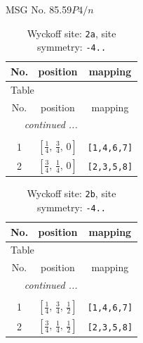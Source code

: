 \documentclass[fleqn,8pt]{jsarticle}
\begin{document}
\setcounter{MaxMatrixCols}{32}

\renewcommand{\tablename}{Table~}
\renewcommand{\figurename}{Figure~}
\begin{center}
\LARGE
MSG No. 85.59\quad$P4/n$
\end{center}
\renewcommand{\arraystretch}{1.2}
\begin{longtable}{ccc}
\caption{Wyckoff site: {\tt 2a}, site symmetry: {\tt -4..}}
 \\
 \hline \hline
No. & position & mapping \\ \hline \endfirsthead

\multicolumn{2}{l}{\tablename\ \thetable{}} \\
 \hline \hline
No. & position & mapping \\ \hline \endhead

 \hline \hline
\multicolumn{2}{r}{\footnotesize\it continued ...} \\ \endfoot

 \hline \hline
\multicolumn{2}{r}{} \\ \endlastfoot

1 & $\left[ \frac{1}{4},\, \frac{3}{4},\, 0 \right]$ & {\tt [1,4,6,7]} \\ \hline
2 & $\left[ \frac{3}{4},\, \frac{1}{4},\, 0 \right]$ & {\tt [2,3,5,8]} \\
\end{longtable}
\renewcommand{\arraystretch}{1.2}
\begin{longtable}{ccc}
\caption{Wyckoff site: {\tt 2b}, site symmetry: {\tt -4..}}
 \\
 \hline \hline
No. & position & mapping \\ \hline \endfirsthead

\multicolumn{2}{l}{\tablename\ \thetable{}} \\
 \hline \hline
No. & position & mapping \\ \hline \endhead

 \hline \hline
\multicolumn{2}{r}{\footnotesize\it continued ...} \\ \endfoot

 \hline \hline
\multicolumn{2}{r}{} \\ \endlastfoot

1 & $\left[ \frac{1}{4},\, \frac{3}{4},\, \frac{1}{2} \right]$ & {\tt [1,4,6,7]} \\ \hline
2 & $\left[ \frac{3}{4},\, \frac{1}{4},\, \frac{1}{2} \right]$ & {\tt [2,3,5,8]} \\
\end{longtable}
\end{document}
